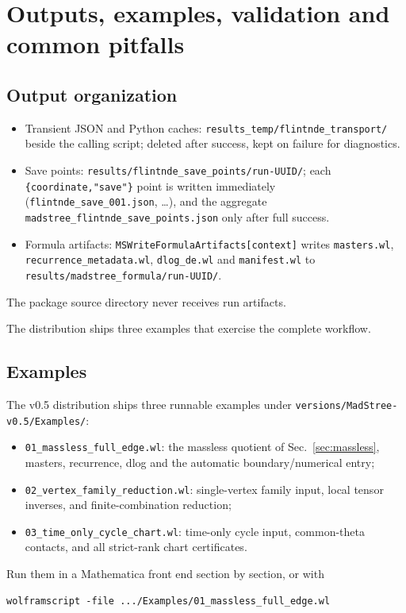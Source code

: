 \documentclass[11pt,a4paper]{article}
\begin{document}
\section{Outputs, examples, validation and common pitfalls}
\label{sec:outputs}

\subsection{Output organization}

\begin{itemize}
  \item Transient JSON and Python caches: \texttt{results\_temp/\allowbreak flintnde\_transport/}
        beside the calling script; deleted after success, kept on failure for diagnostics.
  \item Save points: \texttt{results/\allowbreak flintnde\_save\_points/\allowbreak run-UUID/};
        each \texttt{\{coordinate,"save"\}} point is written immediately
        (\texttt{flintnde\_save\_001.json}, \dots), and the aggregate
        \texttt{madstree\_flintnde\_save\_points\allowbreak .json} only after full success.
  \item Formula artifacts: \texttt{MSWriteFormulaArtifacts[context]} writes \texttt{masters.wl},
        \texttt{recurrence\_metadata.wl}, \texttt{dlog\_de.wl} and \texttt{manifest.wl} to
        \texttt{results/\allowbreak madstree\_formula/\allowbreak run-UUID/}.
\end{itemize}
The package source directory never receives run artifacts.

The distribution ships three examples that exercise the complete workflow.

\subsection{Examples}
\label{sec:examples}

The v0.5 distribution ships three runnable examples under
\texttt{versions/MadStree-v0.5/Examples/}:
\begin{itemize}
  \item \texttt{01\_massless\_full\_edge.wl}: the massless quotient of Sec.~\ref{sec:massless},
        masters, recurrence, dlog and the automatic boundary/numerical entry;
  \item \texttt{02\_vertex\_family\_reduction.wl}: single-vertex family input, local tensor
        inverses, and finite-combination reduction;
  \item \texttt{03\_time\_only\_cycle\_chart.wl}: time-only cycle input, common-theta contacts, and
        all strict-rank chart certificates.
\end{itemize}
Run them in a Mathematica front end section by section, or with
\begin{verbatim}
wolframscript -file .../Examples/01_massless_full_edge.wl
\end{verbatim}
\end{document}
